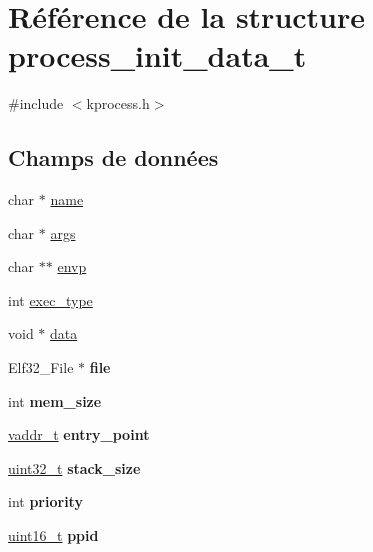 \hypertarget{structprocess__init__data__t}{\section{\-Référence de la structure process\-\_\-init\-\_\-data\-\_\-t}
\label{structprocess__init__data__t}
}


{\ttfamily \#include $<$kprocess.\-h$>$}

\subsection*{\-Champs de données}
\begin{DoxyCompactItemize}
\item 
char $\ast$ \hyperlink{structprocess__init__data__t_a6bdcab0bceaafa6e65a236904fb5a157}{name}
\item 
char $\ast$ \hyperlink{structprocess__init__data__t_a16d011771835f06e0bb3d5fd6115e13c}{args}
\item 
char $\ast$$\ast$ \hyperlink{structprocess__init__data__t_a863d82fbd718f53164a520f67376eac2}{envp}
\item 
int \hyperlink{structprocess__init__data__t_a1cda790f7d2446a04562094f09e358ab}{exec\-\_\-type}
\item 
void $\ast$ \hyperlink{structprocess__init__data__t_ae950cc2a2cc04d1c00a71f70c2fde72c}{data}
\item 
\hypertarget{structprocess__init__data__t_a423d726f5e4621a1aae6a6d96ed2c380}{\-Elf32\-\_\-\-File $\ast$ {\bfseries file}}\label{structprocess__init__data__t_a423d726f5e4621a1aae6a6d96ed2c380}

\item 
\hypertarget{structprocess__init__data__t_ae720e802d58d2f1457e34998063695a1}{int {\bfseries mem\-\_\-size}}\label{structprocess__init__data__t_ae720e802d58d2f1457e34998063695a1}

\item 
\hypertarget{structprocess__init__data__t_acf333ed57db9a2ca636801dcbc41da7e}{\hyperlink{types_8h_a53428b953a0ae6fba02a5b3596c867e0}{vaddr\-\_\-t} {\bfseries entry\-\_\-point}}\label{structprocess__init__data__t_acf333ed57db9a2ca636801dcbc41da7e}

\item 
\hypertarget{structprocess__init__data__t_a8a9c2d2d0d602f8e2f3dc2f4c425da29}{\hyperlink{types_8h_a33594304e786b158f3fb30289278f5af}{uint32\-\_\-t} {\bfseries stack\-\_\-size}}\label{structprocess__init__data__t_a8a9c2d2d0d602f8e2f3dc2f4c425da29}

\item 
\hypertarget{structprocess__init__data__t_a3147915ee1aa09fd84245e28635c60c8}{int {\bfseries priority}}\label{structprocess__init__data__t_a3147915ee1aa09fd84245e28635c60c8}

\item 
\hypertarget{structprocess__init__data__t_a34f85f3f56546700b1dc942070944e27}{\hyperlink{types_8h_adf4d876453337156dde61095e1f20223}{uint16\-\_\-t} {\bfseries ppid}}\label{structprocess__init__data__t_a34f85f3f56546700b1dc942070944e27}

\end{DoxyCompactItemize}


